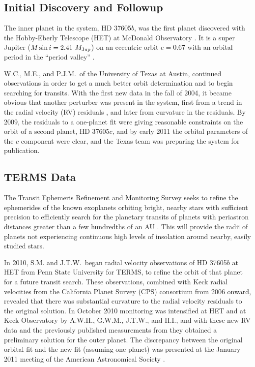 \subsection{Initial Discovery and Followup}

The inner planet in the system, HD 37605$b$, was the first planet
discovered with the Hobby-Eberly Telescope (HET) at McDonald
Observatory \citep{cochran2004}.  It is a super Jupiter ($M\sin{i} =
2.41\ M_{\rm Jup}$) on an eccentric orbit $e=0.67$ with an orbital period in
the ``period valley'' \citep[$P=55$ days;][]{2009ApJ...693.1084W}.

W.C., M.E., and P.J.M.\, of the University of Texas at
Austin, continued observations in order to get a much better orbit determination
and to begin searching for transits. With the first new data in the
fall of 2004, it became obvious that another perturber was present in
the system, first from a trend in the radial velocity (RV) residuals
\citep[i.e., a none-zero $\mbox{d} v/\mbox{d} t$; ][]{wit2007}, and
later from curvature in the residuals. By 2009, the residuals to a
one-planet fit were giving reasonable constraints on the orbit of a
second planet, HD 37605$c$, and by early 2011 the orbital parameters
of the $c$ component were clear, and the Texas team was preparing the
system for publication.

\subsection{TERMS Data}

The Transit Ephemeris Refinement and Monitoring Survey \citep[TERMS;][]{Kane2009} seeks
to refine the ephemerides of the known exoplanets orbiting bright,
nearby stars with sufficient precision to efficiently search for the
planetary transits of planets with periastron distances greater than a
few hundredths of an AU
\citep{2011EPJWC..1106005K, 2011ApJ...743..162P, 2011AJ....142..115D}.
This will provide the radii of planets not experiencing continuous high
levels of insolation around nearby, easily studied stars.

In 2010, S.M. and J.T.W.\ began radial velocity observations of HD
37605$b$ at HET from Penn State University for TERMS, to refine the
orbit of that planet for a future transit search. These observations,
combined with Keck radial velocities from the California Planet Survey (CPS)
consortium from 2006 onward, revealed that there was substantial
curvature to the radial velocity residuals to the original
\cite{cochran2004} solution. In October 2010 monitoring was
intensified at HET and at Keck Observatory by A.W.H., G.W.M., J.T.W.,
and H.I., and with these new RV data and the previously published
measurements from \cite{wit2007} they obtained a preliminary
solution for the outer planet. The discrepancy between the original
orbital fit and the new fit (assuming one planet) was presented at the
January 2011 meeting of the American Astronomical Society
\citep{terms2011aas}.

